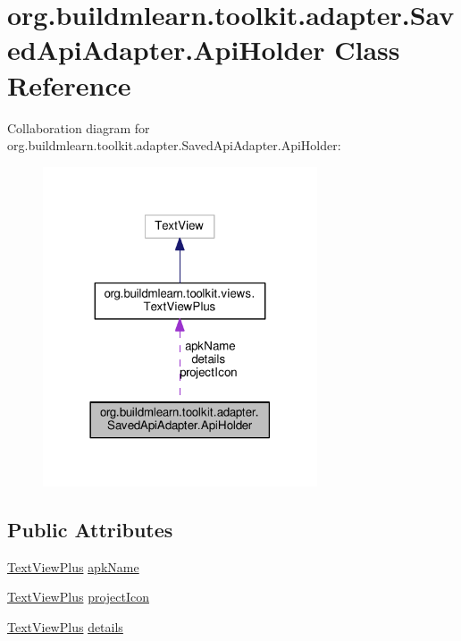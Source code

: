 \hypertarget{classorg_1_1buildmlearn_1_1toolkit_1_1adapter_1_1SavedApiAdapter_1_1ApiHolder}{}\section{org.\+buildmlearn.\+toolkit.\+adapter.\+Saved\+Api\+Adapter.\+Api\+Holder Class Reference}
\label{classorg_1_1buildmlearn_1_1toolkit_1_1adapter_1_1SavedApiAdapter_1_1ApiHolder}


Collaboration diagram for org.\+buildmlearn.\+toolkit.\+adapter.\+Saved\+Api\+Adapter.\+Api\+Holder\+:
\nopagebreak
\begin{figure}[H]
\begin{center}
\leavevmode
\includegraphics[width=230pt]{classorg_1_1buildmlearn_1_1toolkit_1_1adapter_1_1SavedApiAdapter_1_1ApiHolder__coll__graph}
\end{center}
\end{figure}
\subsection*{Public Attributes}
\begin{DoxyCompactItemize}
\item 
\hyperlink{classorg_1_1buildmlearn_1_1toolkit_1_1views_1_1TextViewPlus}{Text\+View\+Plus} \hyperlink{classorg_1_1buildmlearn_1_1toolkit_1_1adapter_1_1SavedApiAdapter_1_1ApiHolder_ae3dd0c05ff430a8ef78e94449c02b0bb}{apk\+Name}
\item 
\hyperlink{classorg_1_1buildmlearn_1_1toolkit_1_1views_1_1TextViewPlus}{Text\+View\+Plus} \hyperlink{classorg_1_1buildmlearn_1_1toolkit_1_1adapter_1_1SavedApiAdapter_1_1ApiHolder_a640c4ad239571e3e2c86b82be9144470}{project\+Icon}
\item 
\hyperlink{classorg_1_1buildmlearn_1_1toolkit_1_1views_1_1TextViewPlus}{Text\+View\+Plus} \hyperlink{classorg_1_1buildmlearn_1_1toolkit_1_1adapter_1_1SavedApiAdapter_1_1ApiHolder_ae98297ead5efa76f607d70c7904a7ec1}{details}
\end{DoxyCompactItemize}


